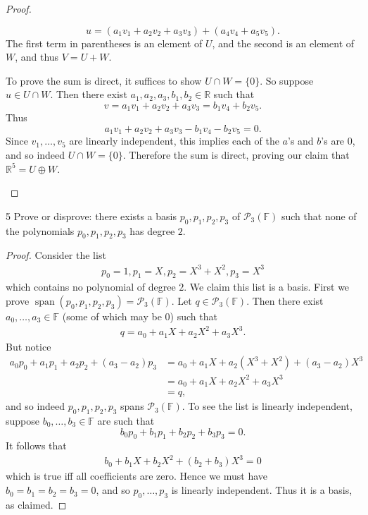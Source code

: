 \documentclass{extarticle}
\newenvironment{problem}[1]{\begin{prob*}{#1}{}}{\end{prob*}}
\newcommand{\R}{\mathbb{R}}
\newcommand{\F}{\mathbb{F}}
\DeclareMathOperator{\Span}{span}
\begin{document}
\begin{proof}
\begin{enumerate}[(a)]
\begin{equation*}
u = (a_1v_1 + a_2v_2 + a_3v_3) + (a_4v_4 + a_5v_5).
\end{equation*}
The first term in parentheses is an element of $U$, and the second is an element of $W$, and thus $V=U+W$.
\par To prove the sum is direct, it suffices to show $U\cap W = \{0\}$.  So suppose $u\in U\cap W$.  Then there exist $a_1,a_2,a_3,b_1,b_2\in\R$ such that 
\begin{equation*}
v = a_1v_1 + a_2v_2 + a_3v_3 = b_1v_4 + b_2v_5.
\end{equation*}
Thus
\begin{equation*}
a_1v_1 + a_2v_2 + a_3v_3 - b_1v_4 - b_2v_5 = 0.
\end{equation*}
Since $v_1,\dots,v_5$ are linearly independent, this implies each of the $a$'s and $b$'s are $0$, and so indeed $U\cap W = \{0\}$.  Therefore the sum is direct, proving our claim that $\R^5 = U\oplus W$. \qedhere
\end{enumerate}
\end{proof}

\begin{problem}{5}
Prove or disprove: there exists a basis $p_0, p_1,p_2,p_3$ of $\mathcal{P}_3(\F)$ such that none of the polynomials $p_0,p_1,p_2,p_3$ has degree $2$.
\end{problem}
\begin{proof}
Consider the list
\begin{align*}
p_0 = 1, p_1 = X, p_2 = X^3 + X^2, p_3 = X^3
\end{align*}
which contains no polynomial of degree $2$.  We claim this list is a basis.  First we prove $\Span(p_0, p_1,p_2,p_3) = \mathcal{P}_3(\F)$.  Let $q\in\mathcal{P}_3(\F)$.  Then there exist $a_0,\dots, a_3\in\F$ (some of which may be $0$) such that
\begin{align*}
q = a_0 + a_1X + a_2X^2 + a_3X^3.
\end{align*}
But notice
\begin{align*}
a_0p_0 + a_1p_1 + a_2p_2 + (a_3-a_2)p_3  &= a_0 + a_1X + a_2(X^3 + X^2) + (a_3-a_2)X^3\\
&= a_0 + a_1X + a_2X^2 + a_3X^3\\
&= q,
\end{align*}
and so indeed $p_0,p_1,p_2,p_3$ spans $\mathcal{P}_3(\F)$.  To see the list is linearly independent, suppose $b_0,\dots,b_3\in\F$ are such that
\begin{equation*}
b_0p_0 + b_1p_1 + b_2p_2 + b_3p_3 = 0.
\end{equation*}
It follows that
\begin{align*}
b_0 + b_1X + b_2X^2 + (b_2 + b_3)X^3 = 0 
\end{align*}
which is true iff all coefficients are zero.  Hence we must have $b_0=b_1=b_2=b_3=0$, and so $p_0,\dots,p_3$ is linearly independent.  Thus it is a basis, as claimed.
\end{proof}
\end{document}

